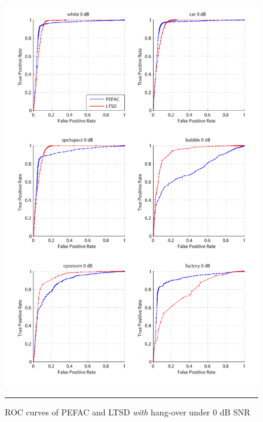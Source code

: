 \begin{figure}[htbp]
	\centering
		\includegraphics[width=1.0\columnwidth]{Figures/AppendixA/pefac0.pdf}
		\rule{37em}{0.5pt}
	\caption[ROC curves of PEFAC and LTSD \emph{with} hang-over under 0 dB SNR]{ROC curves of PEFAC and LTSD \emph{with} hang-over under 0 dB SNR}
	\label{fig:pefac0}
\end{figure}

